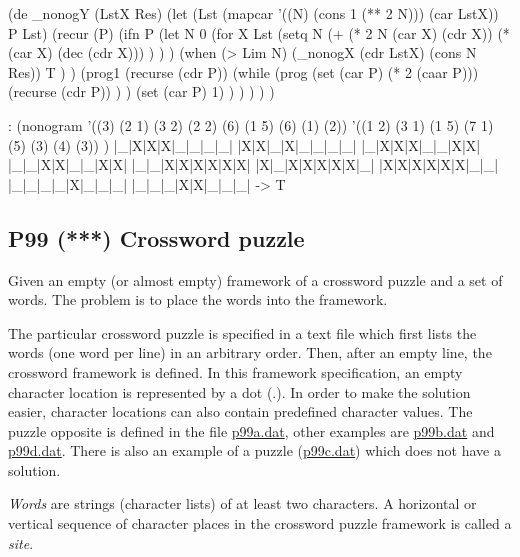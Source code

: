 \begin{wideverbatim}


(de _nonogY (LstX Res)
   (let (Lst (mapcar '((N) (cons 1 (** 2 N))) (car LstX))  P Lst)
      (recur (P)
         (ifn P
            (let N 0
               (for X Lst
                  (setq N
                     (+
                        (* 2 N (car X) (cdr X))
                        (* (car X) (dec (cdr X))) ) ) )
               (when (> Lim N)
                  (_nonogX (cdr LstX) (cons N Res))
                  T ) )
            (prog1 (recurse (cdr P))
               (while
                  (prog
                     (set (car P) (* 2 (caar P)))
                     (recurse (cdr P)) ) )
               (set (car P) 1) ) ) ) ) )

: (nonogram
   '((3) (2 1) (3 2) (2 2) (6) (1 5) (6) (1) (2))
   '((1 2) (3 1) (1 5) (7 1) (5) (3) (4) (3)) )
|_|X|X|X|_|_|_|_|
|X|X|_|X|_|_|_|_|
|_|X|X|X|_|_|X|X|
|_|_|X|X|_|_|X|X|
|_|_|X|X|X|X|X|X|
|X|_|X|X|X|X|X|_|
|X|X|X|X|X|X|_|_|
|_|_|_|_|X|_|_|_|
|_|_|_|X|X|_|_|_|
-> T

\end{wideverbatim}

\pagebreak{}
\subsection*{{P99} (***) Crossword puzzle}
\label{sec:99-problems-P99}

Given an empty (or almost empty) framework of a crossword puzzle and a
set of words. The problem is to place the words into the framework.


The particular crossword puzzle is specified in a text file which
first lists the words (one word per line) in an arbitrary order. Then,
after an empty line, the crossword framework is defined. In this
framework specification, an empty character location is represented by
a dot (.). In order to make the solution easier, character locations
can also contain predefined character values. The puzzle opposite is
defined in the file \href{!wiki?99p99a}{p99a.dat}, other examples are
\href{!wiki?99p99b}{p99b.dat} and \href{!wiki?99p99d}{p99d.dat}. There
is also an example of a puzzle (\href{!wiki?99p99c}{p99c.dat}) which
does not have a solution.

\emph{Words} are strings (character lists) of at least two characters.
A horizontal or vertical sequence of character places in the crossword
puzzle framework is called a \emph{site}.

